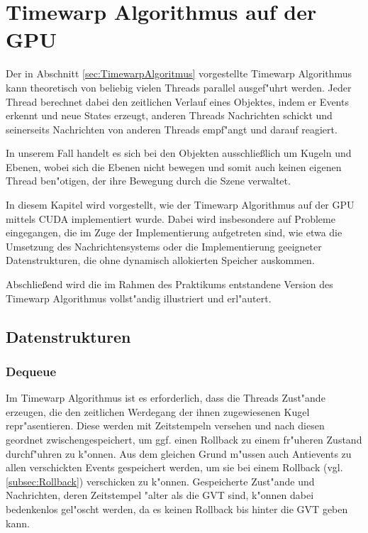 \documentclass[a4paper, 10pt, openright, parskip, chapterprefix]{scrreprt}
\begin{document}
\chapter{Timewarp Algorithmus auf der GPU}
Der in Abschnitt \ref{sec:TimewarpAlgoritmus} vorgestellte Timewarp Algorithmus kann theoretisch von beliebig vielen Threads
parallel ausgef"uhrt werden. Jeder Thread berechnet dabei den zeitlichen Verlauf eines Objektes, indem er Events erkennt
und neue States erzeugt, anderen Threads Nachrichten schickt und seinerseits Nachrichten von anderen Threads empf"angt
und darauf reagiert. 

In unserem Fall handelt es sich bei den Objekten ausschlie\ss lich um Kugeln und Ebenen, wobei sich die Ebenen nicht
bewegen und somit auch keinen eigenen Thread ben"otigen, der ihre Bewegung durch die Szene verwaltet.

In diesem Kapitel wird vorgestellt, wie der Timewarp Algorithmus auf der GPU mittels CUDA implementiert wurde. Dabei wird
insbesondere auf Probleme eingegangen, die im Zuge der Implementierung aufgetreten sind, wie etwa die Umsetzung des
Nachrichtensystems oder die Implementierung geeigneter Datenstrukturen, die ohne dynamisch allokierten Speicher
auskommen.

Abschlie\ss end wird die im Rahmen des Praktikums entstandene Version des Timewarp Algorithmus vollst"andig illustriert
und erl"autert.

\section{Datenstrukturen}
\subsection{Dequeue}
Im Timewarp Algorithmus ist es erforderlich, dass die Threads Zust"ande erzeugen, die den zeitlichen Werdegang der ihnen zugewiesenen
Kugel repr"asentieren. Diese werden mit Zeitstempeln versehen und nach diesen geordnet zwischengespeichert, um ggf. einen Rollback zu einem
fr"uheren Zustand durchf"uhren zu k"onnen. Aus dem gleichen Grund m"ussen auch Antievents zu allen verschickten Events gespeichert
werden, um sie bei einem Rollback (vgl. \ref{subsec:Rollback}) verschicken zu k"onnen.
Gespeicherte Zust"ande und Nachrichten, deren Zeitstempel "alter als die GVT sind, k"onnen dabei bedenkenlos gel"oscht
werden, da es keinen Rollback bis hinter die GVT geben kann.
\end{document}

